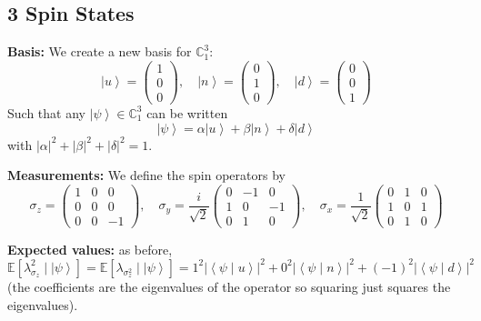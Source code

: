 \documentclass[12pt]{article}
\newcommand{\brak}[1]{\left\langle #1 \right\rangle}
\newcommand{\C}{\mathbb{C}}
\newcommand{\ket}[1]{\left\vert #1 \right\rangle}
\newcommand{\E}{\mathbb{E}}
\newcommand{\abs}[1]{\left\vert #1 \right\vert}
\begin{document}
    \subsection*{3 Spin States}
        \textbf{Basis:} We create a new basis for $\C_1^3$:
        \[\ket{u} = \begin{pmatrix}
            1\\0\\0
        \end{pmatrix}, \quad \ket{n} = \begin{pmatrix}
            0\\1\\0
        \end{pmatrix}, \quad \ket{d} = \begin{pmatrix}
            0\\0\\1
        \end{pmatrix}\]
        Such that any $\ket{\psi} \in \C_1^3$ can be written 
        \[\ket{\psi} = \alpha \ket{u} + \beta \ket n + \delta \ket{d}\]
        with $\abs \alpha^2 + \abs \beta^2 + \abs \delta^2 = 1$.

        \textbf{Measurements:} We define the spin operators by
        \[\sigma_z = \begin{pmatrix}
            1 & 0 & 0\\
            0 & 0 & 0\\
            0 & 0 & -1
        \end{pmatrix}, \quad \sigma_y = \frac{i}{\sqrt 2}\begin{pmatrix}
            0 & -1 & 0\\
            1 & 0 & -1\\
            0 & 1 & 0
        \end{pmatrix}, \quad \sigma_x = \frac{1}{\sqrt 2}\begin{pmatrix}
            0 & 1 & 0\\
            1 & 0 & 1\\
            0 & 1 & 0
        \end{pmatrix}\]
        
        \textbf{Expected values:} as before, 
        \[\E[\lambda_{\sigma_z}^2 \; | \; \ket{\psi}] = \E[\lambda_{\sigma^2_z} \; | \; \ket \psi] = 1^2 \abs{\brak{\psi \; | \; u}}^2 + 0^2 \abs{\brak{\psi \; | \; n}}^2 + (-1)^2 \abs{\brak{\psi \; | \; d}}^2\]
        (the coefficients are the eigenvalues of the operator so squaring just squares the eigenvalues).
\end{document}
